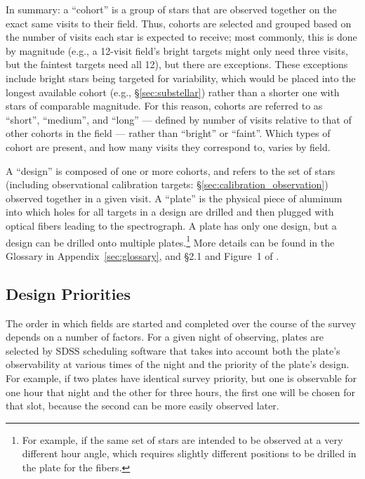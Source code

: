 \documentclass[12pt,twocolumn]{emulateapj}
\begin{document}
In summary: a ``cohort'' is a group of stars that are observed together on the exact same visits to their field.
Thus, cohorts are selected and grouped based on the number of visits each star is expected to receive;
most commonly, this is done by magnitude (e.g., a 12-visit field's bright targets might only need three visits, but the faintest targets need all 12),
but there are exceptions.  These exceptions include bright stars being targeted for variability, which would be placed into the longest available cohort (e.g., \S\ref{sec:substellar}) rather than a shorter one with stars of comparable magnitude.
For this reason, cohorts are referred to as ``short'', ``medium'', and ``long'' --- defined by number of visits relative to that of other cohorts in the field --- rather than ``bright'' or ``faint''.  Which types of cohort are present, and how many visits they correspond to, varies by field.

A ``design'' is composed of one or more cohorts, and refers to the set of stars 
(including observational calibration targets: \S\ref{sec:calibration_observation})
observed together in a given visit.  
A ``plate'' is the physical piece of aluminum into which holes for all targets in a design 
are drilled and then plugged with optical fibers leading to the spectrograph.
A plate has only one design, but a design can be drilled onto multiple plates.\footnote{For example, if the same set of stars are intended to be observed at a very different hour angle, which requires slightly different positions to be drilled in the plate for the fibers.}
More details can be found in the Glossary in Appendix~\ref{sec:glossary}, and \S2.1 and Figure~1 of \citet{Zasowski_2013_apogeetargeting}.


\subsection{Design Priorities}

The order in which fields are started and completed over the course of the survey 
depends on a number of factors.  
For a given night of observing, plates are selected
by SDSS scheduling software that takes into account both the plate's observability at 
various times of the night and the priority of the plate's design.
For example, 
if two plates have identical survey priority, but one is observable for one hour that night and the other for three hours, the first one will be chosen for that slot, because the second can be more easily observed later.
\end{document}
